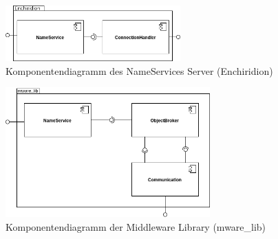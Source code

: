 \documentclass{article}
\begin{document}
\begin{figure}[H]
    \centering
    \includegraphics[width=0.6\textwidth]{nameservice-components.png}
    \caption[nameservice-components]{Komponentendiagramm des NameServices Server (Enchiridion)}
    \label{fig:nameservice-component-diagram}
\end{figure}

\begin{figure}[H]
    \centering
    \includegraphics[width=0.7\textwidth]{Middleware_Components.png}
    \caption[middleware-components]{Komponentendiagramm der Middleware Library (mware\_lib)}
    \label{fig:middleware-components-diagram}
\end{figure}
\end{document}
